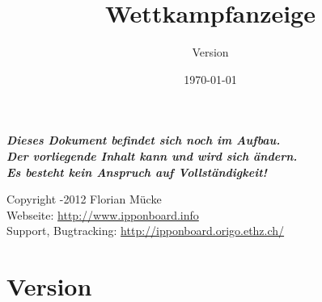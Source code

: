 ﻿\documentclass[11pt,numbers=noenddot]{scrreprt}
\title{{\IB} Wettkampfanzeige}
\subtitle{Version \IBVersion}
\date{\today}
\begin{document}
\maketitle

\thispagestyle{empty}

\vspace*{\fill}

{\centering\bfseries\itshape\LARGE
Dieses Dokument befindet sich noch im Aufbau.\\
Der vorliegende Inhalt kann und wird sich ändern.\\
Es besteht kein Anspruch auf Vollständigkeit! \par}

\vspace*{\fill}

\begin{center}
{%
Copyright -2012 Florian Mücke \\
Webseite: \url{http://www.ipponboard.info} \\
Support, Bugtracking: \url{http://ipponboard.origo.ethz.ch/}}
\end{center}


\renewcommand\contentsname{Inhalt}
\tableofcontents

\chapter{Version}
\end{document}
